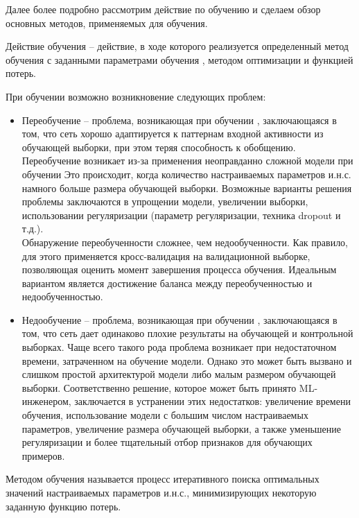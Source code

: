 Далее более подробно рассмотрим действие по обучению  и сделаем обзор основных методов, применяемых для обучения.

Действие обучения   -- действие, в ходе которого реализуется определенный метод обучения   с заданными параметрами обучения  , методом оптимизации и функцией потерь.

При обучении возможно возникновение следующих проблем:

\begin{itemize}
	\item Переобучение -- проблема, возникающая при обучении  , заключающаяся в том,
	что сеть хорошо адаптируется к паттернам входной активности из обучающей выборки, при этом теряя способность к обобщению.
	Переобучение возникает из-за применения неоправданно сложной модели при обучении   Это происходит,
	когда количество настраиваемых параметров и.н.с. намного больше размера обучающей выборки. Возможные
	варианты решения проблемы заключаются в упрощении модели, увеличении выборки, использовании регуляризации
	(параметр регуляризации, техника dropout и т.д.).\\
	Обнаружение переобученности сложнее, чем недообученности. Как правило, для этого применяется
	кросс-валидация на валидационной выборке, позволяющая оценить момент завершения процесса обучения.
	Идеальным вариантом является достижение баланса между переобученностью и недообученностью.
	
	\item Недообучение -- проблема, возникающая при обучении  , заключающаяся в том,
	что сеть дает одинаково плохие результаты на обучающей и контрольной выборках.
	Чаще всего такого рода проблема возникает при недостаточном времени, затраченном на обучение модели.
	Однако это может быть вызвано и слишком простой архитектурой модели либо малым размером обучающей
	выборки. Соответственно решение, которое может быть принято ML-инженером, заключается в устранении
	этих недостатков: увеличение времени обучения, использование модели с большим числом настраиваемых
	параметров, увеличение размера обучающей выборки, а также уменьшение регуляризации и более тщательный
	отбор признаков для обучающих примеров.
\end{itemize}

Методом обучения  называется процесс итеративного поиска оптимальных значений настраиваемых параметров и.н.с., минимизирующих некоторую заданную функцию потерь.

